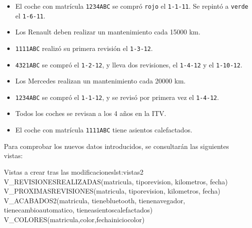 \begin{homeworkProblem}

  \begin{itemize}
  \item El coche con matrícula \texttt{1234ABC} se compró \texttt{rojo} el \texttt{1-1-11}. Se repintó a \texttt{verde} el \texttt{1-6-11}.
  \item  Los Renault deben realizar un mantenimiento cada 15000 km.
    
  \item \texttt{1111ABC} realizó su primera revisión el \texttt{1-3-12}.
  \item \texttt{4321ABC} se compró el \texttt{1-2-12}, y lleva dos revisiones, el \texttt{1-4-12} y el \texttt{1-10-12}.

  \item Los Mercedes realizan un mantenimiento cada 20000 km. 
  \item \texttt{1234ABC}   se compró el \texttt{1-1-12}, y se revisó por primera vez el \texttt{1-4-12}.
  \item Todos los coches se revisan a los 4 años en la ITV.
  \item El coche con matrícula \texttt{1111ABC} tiene asientos calefactados.
  \end{itemize}

  Para comprobar los nuevos datos introducidos, se consultarán las siguientes vistas:
  
  \begin{listadosql}{Vistas a crear tras las modificaciones}{lst:vistas2}
  V_REVISIONESREALIZADAS(matricula, tiporevision, kilometros, fecha)
  V_PROXIMASREVISIONES(matricula, tiporevision, kilometros, fecha)
  V_ACABADOS2(matricula, tienebluetooth, tienenavegador, tienecambioautomatico, tieneasientoscalefactados)
  V_COLORES(matricula,color,fechainiciocolor)
  \end{listadosql}

\end{homeworkProblem}

